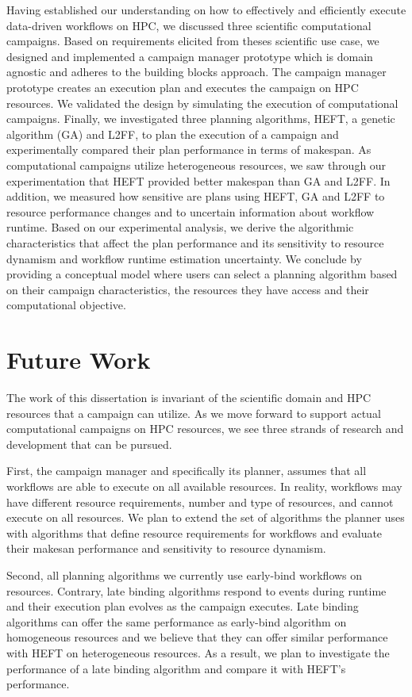 Having established our understanding on how to effectively and efficiently execute data-driven workflows on HPC, we discussed three scientific computational campaigns.
Based on requirements elicited from theses scientific use case, we designed and implemented a campaign manager prototype which is domain agnostic and adheres to the building blocks approach.
The campaign manager prototype creates an execution plan and executes the campaign on HPC resources.
We validated the design by simulating the execution of computational campaigns.
Finally, we investigated three planning algorithms, HEFT, a genetic algorithm (GA) and L2FF, to plan the execution of a campaign and experimentally compared their plan performance in terms of makespan.
As computational campaigns utilize heterogeneous resources, we saw through our experimentation that HEFT provided better makespan than GA and L2FF.
In addition, we measured how sensitive are plans using HEFT, GA and L2FF to resource performance changes and to uncertain information about workflow runtime.
Based on our experimental analysis, we derive the algorithmic characteristics that affect the plan performance and its sensitivity to resource dynamism and workflow runtime estimation uncertainty.
We conclude by providing a conceptual model where users can select a planning algorithm based on their campaign characteristics, the resources they have access and their computational objective.


\section{Future Work}
The work of this dissertation is invariant of the scientific domain and HPC resources that a campaign can utilize.
As we move forward to support actual computational campaigns on HPC resources, we see three strands of research and development that can be pursued.

First, the campaign manager and specifically its planner, assumes that all workflows are able to execute on all available resources.
In reality, workflows may have different resource requirements, number and type of resources, and cannot execute on all resources.
We plan to extend the set of algorithms the planner uses with algorithms that define resource requirements for workflows and evaluate their makesan performance and sensitivity to resource dynamism.

Second, all planning algorithms we currently use early-bind workflows on resources.
Contrary, late binding algorithms respond to events during runtime and their execution plan evolves as the campaign executes.
Late binding algorithms can offer the same performance as early-bind algorithm on homogeneous resources and we believe that they can offer similar performance with HEFT on heterogeneous resources.
As a result, we plan to investigate the performance of a late binding algorithm and compare it with HEFT's performance.

